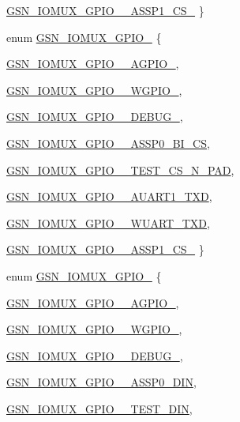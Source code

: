 \begin{DoxyCompactItemize}
\hyperlink{a00519_a88ad3958e476541f6f56ac2adb3e6218ace0b35fc594956341e853b96df50d186}{GSN\_\-IOMUX\_\-GPIO\_\_\-ASSP1\_\-CS\_}
 \}
\item 
enum \hyperlink{a00519_a79ae1b7c666e4b5ebe6c49f29cd0d8d2}{GSN\_\-IOMUX\_\-GPIO\_} \{ \par
\hyperlink{a00519_a79ae1b7c666e4b5ebe6c49f29cd0d8d2a86f9ecce89c620963ef7bc58f290c68d}{GSN\_\-IOMUX\_\-GPIO\_\_\-AGPIO\_}, 
\par
\hyperlink{a00519_a79ae1b7c666e4b5ebe6c49f29cd0d8d2a810aadac744035855a5462e4ec069c1c}{GSN\_\-IOMUX\_\-GPIO\_\_\-WGPIO\_}, 
\par
\hyperlink{a00519_a79ae1b7c666e4b5ebe6c49f29cd0d8d2afd0b1dfcc317801eedfc5bdb7db7a14a}{GSN\_\-IOMUX\_\-GPIO\_\_\-DEBUG\_}, 
\par
\hyperlink{a00519_a79ae1b7c666e4b5ebe6c49f29cd0d8d2a6e6e241676bf1c67c43af38f04f4bb88}{GSN\_\-IOMUX\_\-GPIO\_\_\-ASSP0\_\-BI\_\-CS}, 
\par
\hyperlink{a00519_a79ae1b7c666e4b5ebe6c49f29cd0d8d2a11780ad1eb31c315a823ae9fc51c570d}{GSN\_\-IOMUX\_\-GPIO\_\_\-TEST\_\-CS\_\-N\_\-PAD}, 
\par
\hyperlink{a00519_a79ae1b7c666e4b5ebe6c49f29cd0d8d2a0c416bf845d4e75e2cafd721515913fc}{GSN\_\-IOMUX\_\-GPIO\_\_\-AUART1\_\-TXD}, 
\par
\hyperlink{a00519_a79ae1b7c666e4b5ebe6c49f29cd0d8d2ac44017d986afa57770904e127bc947af}{GSN\_\-IOMUX\_\-GPIO\_\_\-WUART\_\-TXD}, 
\par
\hyperlink{a00519_a79ae1b7c666e4b5ebe6c49f29cd0d8d2a55f361777456703392fc52f787c8e57f}{GSN\_\-IOMUX\_\-GPIO\_\_\-ASSP1\_\-CS\_}
 \}
\item 
enum \hyperlink{a00519_afa6173189136b639c78c6019bc59d4ac}{GSN\_\-IOMUX\_\-GPIO\_} \{ \par
\hyperlink{a00519_afa6173189136b639c78c6019bc59d4aca456fba0cf15100e6323176e51e260ffc}{GSN\_\-IOMUX\_\-GPIO\_\_\-AGPIO\_}, 
\par
\hyperlink{a00519_afa6173189136b639c78c6019bc59d4aca4e4081687c45c017be0c1b825095d201}{GSN\_\-IOMUX\_\-GPIO\_\_\-WGPIO\_}, 
\par
\hyperlink{a00519_afa6173189136b639c78c6019bc59d4acab9eb7f6cd5683a2330949a8aa546be8e}{GSN\_\-IOMUX\_\-GPIO\_\_\-DEBUG\_}, 
\par
\hyperlink{a00519_afa6173189136b639c78c6019bc59d4aca81bf6b1d5775692b63599962aec5182a}{GSN\_\-IOMUX\_\-GPIO\_\_\-ASSP0\_\-DIN}, 
\par
\hyperlink{a00519_afa6173189136b639c78c6019bc59d4aca014882c0537f6815e9a69393894df50e}{GSN\_\-IOMUX\_\-GPIO\_\_\-TEST\_\-DIN}, 

\end{DoxyCompactItemize}
